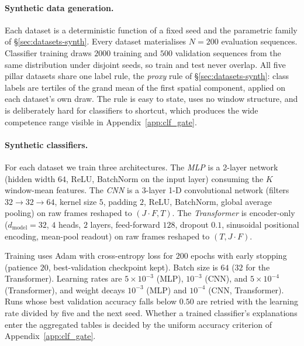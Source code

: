 \paragraph{Synthetic data generation.}
Each dataset is a deterministic function of a fixed seed and the parametric
family of \S\ref{sec:datasets-synth}.  Every dataset materialises $N{=}200$
evaluation sequences.  Classifier training draws $2000$ training and $500$
validation sequences from the same distribution under disjoint seeds, so
train and test never overlap.  All five pillar datasets share one label
rule, the \emph{proxy} rule of \S\ref{sec:datasets-synth}: class labels are
tertiles of the grand mean of the first spatial component, applied on each
dataset's own draw.  The rule is easy to state, uses no window structure,
and is deliberately hard for classifiers to shortcut, which produces the
wide competence range visible in Appendix~\ref{app:clf_gate}.

\paragraph{Synthetic classifiers.}
For each dataset we train three architectures.  The \emph{MLP} is a 2-layer
network (hidden width $64$, ReLU, BatchNorm on the input layer) consuming
the $K$ window-mean features.  The \emph{CNN} is a 3-layer 1-D convolutional
network (filters $32{\to}32{\to}64$, kernel size $5$, padding $2$, ReLU,
BatchNorm, global average pooling) on raw frames reshaped to
$(J\!\cdot\!F, T)$.  The \emph{Transformer} is encoder-only
($d_{\mathrm{model}}{=}32$, $4$ heads, $2$ layers, feed-forward $128$,
dropout $0.1$, sinusoidal positional encoding, mean-pool readout) on raw
frames reshaped to $(T, J\!\cdot\!F)$.

Training uses Adam with cross-entropy loss for $200$ epochs with early
stopping (patience $20$, best-validation checkpoint kept).  Batch size is
$64$ ($32$ for the Transformer).  Learning rates are $5{\times}10^{-3}$
(MLP), $10^{-3}$ (CNN), and $5{\times}10^{-4}$ (Transformer), and weight
decays $10^{-3}$ (MLP) and $10^{-4}$ (CNN, Transformer).  Runs whose best
validation accuracy falls below $0.50$ are retried with the learning rate
divided by five and the next seed.  Whether a trained classifier's
explanations enter the aggregated tables is decided by the uniform
accuracy criterion of Appendix~\ref{app:clf_gate}.

